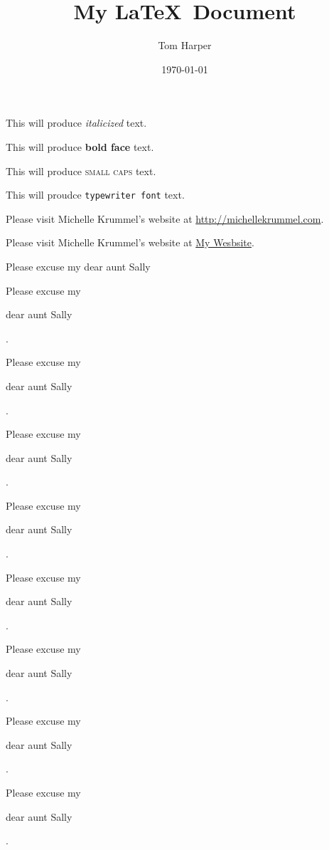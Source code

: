\documentclass[11pt]{article}
\title{My \LaTeX\ Document}
\author{Tom Harper}
\date{\today}
\begin{document}
\tableofcontents %

\maketitle

This will produce \textit{italicized} text.

This will produce \textbf{bold face} text.

This will produce \textsc{small caps} text.

This will proudce \texttt{typewriter font} text.

Please visit Michelle Krummel's website at \url{http://michellekrummel.com}.

Please visit Michelle Krummel's website at \href{http://michellekrummel.com}{My Wesbsite}.

\vspace{1cm}

Please excuse my dear aunt Sally

Please excuse my \begin{large}dear aunt Sally\end{large}.

Please excuse my \begin{Large}dear aunt Sally\end{Large}.

Please excuse my \begin{huge}dear aunt Sally\end{huge}.

Please excuse my \begin{Huge}dear aunt Sally\end{Huge}.

Please excuse my \begin{normalsize}dear aunt Sally\end{normalsize}.

Please excuse my \begin{small}dear aunt Sally\end{small}.

Please excuse my \begin{scriptsize}dear aunt Sally\end{scriptsize}.

Please excuse my \begin{tiny}dear aunt Sally\end{tiny}.

\vspace{1cm}
\end{document}
